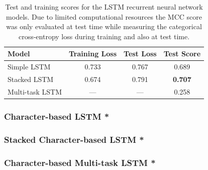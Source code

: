 \begin{table}[h]
  \begin{center}
    \begin{tabular}{ l c c c }
      \toprule
      Model & Training Loss & Test Loss & Test Score \\
      \midrule
      Simple LSTM & 0.733 & 0.767 & 0.689 \\
      Stacked LSTM & 0.674 & 0.791 & \textbf{0.707} \\
      Multi-task LSTM & --- & --- & 0.258 \\
      \bottomrule
    \end{tabular}
  \caption{Test and training scores for the LSTM recurrent neural network models. Due to limited computational resources the \gls{MCC} score was only evaluated at test time while measuring the categorical cross-entropy loss during training and also at test time.}
\label{tab:LSTM Results}
\end{center}
\end{table}

\subsubsection{Character-based LSTM *}

\subsubsection{Stacked Character-based LSTM *}

\subsubsection{Character-based Multi-task LSTM *}
